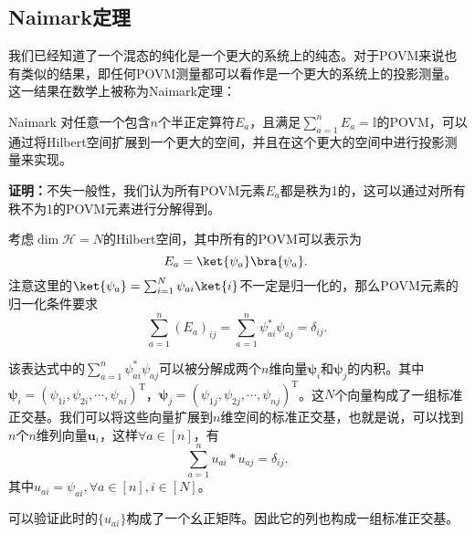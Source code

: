 \subsection{Naimark定理}
我们已经知道了一个混态的纯化是一个更大的系统上的纯态。对于POVM来说也有类似的结果，即任何POVM测量都可以看作是一个更大的系统上的投影测量。这一结果在数学上被称为Naimark定理：
\begin{theorem}{Naimark}
对任意一个包含$n$个半正定算符$E_a$，且满足$\sum_{a=1}^n E_a=\mathbb{I}$的POVM，可以通过将Hilbert空间扩展到一个更大的空间，并且在这个更大的空间中进行投影测量来实现。
\end{theorem}

\noindent\textbf{证明：}不失一般性，我们认为所有POVM元素$E_a$都是秩为1的，这可以通过对所有秩不为1的POVM元素进行分解得到。

考虑$\operatorname{dim}\mathcal{H}=N$的Hilbert空间，其中所有的POVM可以表示为
\begin{equation}
E_a=\ket{\psi_a}\bra{\psi_a}.~
\end{equation}
注意这里的$\ket{\psi_a}=\sum_{i=1}^N\psi_{ai}\ket{i}$不一定是归一化的，那么POVM元素的归一化条件要求
\begin{equation}
\sum_{a=1}^n\left(E_a\right)_{i j}=\sum_{a=1}^n \psi_{a i}^* \psi_{a j}=\delta_{i j}.~
\end{equation}

该表达式中的$\sum_{a=1}^n \psi_{a i}^* \psi_{a j}$可以被分解成两个$n$维向量$\boldsymbol{\psi}_i$和$\boldsymbol{\psi}_j$的内积。其中$\boldsymbol{\psi}_i=\left(\psi_{1 i}, \psi_{2 i}, \cdots, \psi_{n i}\right)^{\mathrm{T}}$，$\boldsymbol{\psi}_j=\left(\psi_{1 j}, \psi_{2 j}, \cdots, \psi_{n j}\right)^{\mathrm{T}}$。这$N$个向量构成了一组标准正交基。我们可以将这些向量扩展到$n$维空间的标准正交基，也就是说，可以找到$n$个$n$维列向量$\boldsymbol{u}_i$，这样$\forall a\in[n]$，有
\begin{equation}
\sum_{a=1}^n u_{a i}*u_{a j}=\delta_{ij}.~
\end{equation}
其中$u_{ai}=\psi_{ai},\forall a\in[n],i\in[N]$。

可以验证此时的$\{u_{ai}\}$构成了一个幺正矩阵。因此它的列也构成一组标准正交基。
